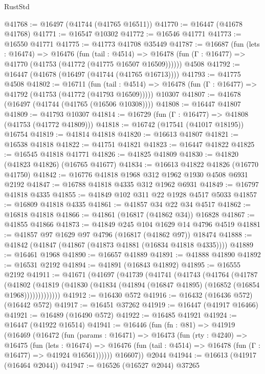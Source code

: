 \begin{lexlean}{RustStd}
\begin{coremodule}
@41768 := @16497 (@41744 (@41765 @16511))
@41770 := @16447 (@41678 @41768)
@41771 := @16547 @10302
@41772 := @16546 @41771
@41773 := @16550 @41771
@41775 := @41773 @41708 @35449
@41787 := @16687
    (fun (lets : @16474) =>
    @16476
      (fun (tail : @4514) =>
      @16478 (fun (Γ : @16477) => @41770 (@41753 (@41772 (@41775 @16507 @16509))))))
    @4508
@41792 := @16447 (@41678 (@16497 (@41744 (@41765 @16713))))
@41793 := @41775 @4508
@41802 := @16711
    (fun (tail : @4514) => @16478 (fun (Γ : @16477) => @41792 (@41753 (@41772 (@41793 @16509)))))
    @10307
@41807 := @41678 (@16497 (@41744 (@41765 (@16506 @10308))))
@41808 := @16447 @41807
@41809 := @41793 @10307
@41814 := @16729 (fun (Γ : @16477) => @41808 (@41753 (@41772 @41809)))
@41818 := @16742 (@17541 (@41017 @18195)) @16754
@41819 := @41814 @41818
@41820 := @16613 @41807
@41821 := @16538 @41818
@41822 := @41751 @41821
@41823 := @16447 @41822
@41825 := @16545 @41818 @41771
@41826 := @41825 @41809
@41830 := @41820 (@41823 @41826) (@16765 @41677)
@41834 := @16613 @41822 @41826 (@16770 @41750)
@41842 := @16776 @41818 @1968 @312 @1962 @1930 @4508 @6931 @2192
@41847 := @16788 @41818 @4335 @312 @1962 @6931
@41849 := @16797 @41818 @4335
@41855 := @41849 @102 @311 @22 @1928 @4517 @5033
@41857 := @16809 @41818 @4335
@41861 := @41857 @34 @22 @34 @4517
@41862 := @16818 @41818
@41866 := @41861 (@16817 (@41862 @34)) @16828
@41867 := @41855 @41866
@41873 := @41849 @245 @104 @1629 @14 @4796 @4519
@41881 := @41857 @97 @1629 @97 @4796 (@16817 (@41862 @97)) @18474
@41888 := @41842 (@41847 (@41867 (@41873 @41881 (@16834 @41818 @4335))))
@41889 := @16461 @1968
@41890 := @16657 @41889
@41891 := @41888 @41890
@41892 := @16531 @2192
@41894 := @41891 (@16843 @41892)
@41895 := @16555 @2192
@41911 := @41671
    (@41697
      (@41739
        (@41741
          (@41743
            (@41764
              (@41787
                (@41802
                  (@41819 (@41830 (@41834 (@41894 (@16847 @41895) (@16852 (@16854 @1968)))))))))))))
@41912 := @16430 @572
@41916 := @16432 (@16436 @572) (@16442 @572)
@41917 := @16451 @37262
@41919 := @16447 (@41917 @16466)
@41921 := @16489 (@16490 @572)
@41922 := @16485 @41921
@41924 := @16447 (@41922 @16514)
@41941 := @16446
    (fun (fn : @81) =>
    @41919
      (@16469
        (@16472
          (fun (params : @16471) =>
          @16473
            (fun (rty : @4240) =>
            @16475
              (fun (lets : @16474) =>
              @16476 (fun (tail : @4514) => @16478 (fun (Γ : @16477) => @41924 @16561))))))
        @16607))
    @2044
@41944 := @16613 (@41917 (@16464 @2044))
@41947 := @16526 (@16527 @2044) @37265

\end{coremodule}
\end{lexlean}
